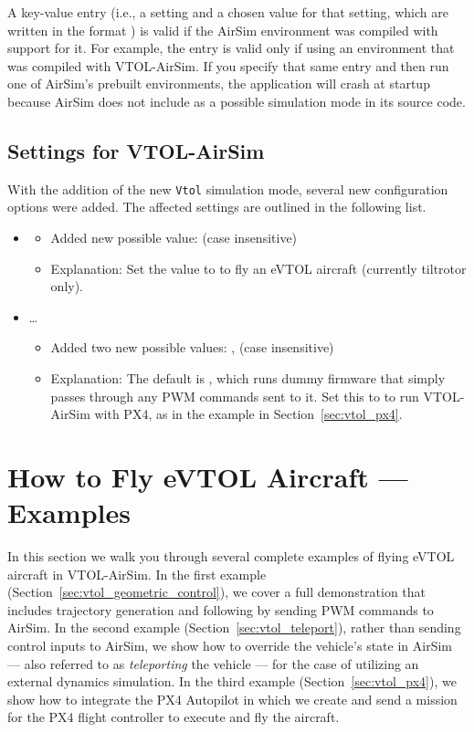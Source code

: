 A key-value entry (i.e., a setting and a chosen value for that setting, which are written in the format ) is valid if the AirSim environment was compiled with support for it. For example, the entry  is valid only if using an environment that was compiled with VTOL-AirSim. If you specify that same entry and then run one of AirSim's prebuilt environments, the application will crash at startup because AirSim does not include  as a possible simulation mode in its source code.

\subsection{Settings for VTOL-AirSim}
With the addition of the new \verb|Vtol| simulation mode, several new configuration options were added. The affected settings are outlined in the following list.

\begin{itemize}
    \item {}
    \begin{itemize}
        \item Added new possible value:  (case insensitive)
        \item Explanation: Set the value to  to fly an eVTOL aircraft (currently tiltrotor only).
    \end{itemize}
    \item {}\ldots{}
    \begin{itemize}
        \item Added two new possible values: ,  (case insensitive)
        \item Explanation: The default is , which runs dummy firmware that simply passes through any PWM commands sent to it. Set this to  to run VTOL-AirSim with PX4, as in the example in Section~\ref{sec:vtol_px4}.
    \end{itemize}
\end{itemize}

\section{How to Fly eVTOL Aircraft --- Examples}\label{sec:vtol_examples}
In this section we walk you through several complete examples of flying eVTOL aircraft in VTOL-AirSim. In the first example (Section~\ref{sec:vtol_geometric_control}), we cover a full demonstration that includes trajectory generation and following by sending PWM commands to AirSim. In the second example (Section~\ref{sec:vtol_teleport}), rather than sending control inputs to AirSim, we show how to override the vehicle's state in AirSim --- also referred to as \textit{teleporting} the vehicle --- for the case of utilizing an external dynamics simulation. In the third example (Section~\ref{sec:vtol_px4}), we show how to integrate the PX4 Autopilot in which we create and send a mission for the PX4 flight controller to execute and fly the aircraft.

